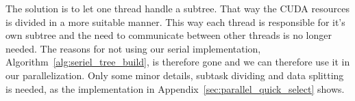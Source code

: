 The solution is to let one thread handle a subtree. That way the CUDA resources is divided in a more suitable manner. This way each thread is responsible for it's own subtree and the need to communicate between other threads is no longer needed. The reasons for not using our serial implementation, Algorithm~\ref{alg:seriel_tree_build}, is therefore gone and we can therefore use it in our parallelization. Only some minor details, subtask dividing and data splitting is needed, as the implementation in Appendix~\ref{sec:parallel_quick_select} shows.








%




